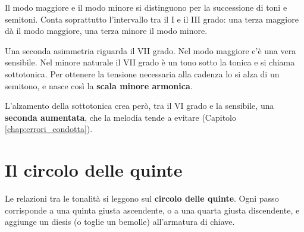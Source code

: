 Il modo maggiore e il modo minore si distinguono per la successione di toni e semitoni. Conta soprattutto l'intervallo tra il I e il III grado: una terza maggiore dà il modo maggiore, una terza minore il modo minore.

Una seconda asimmetria riguarda il VII grado. Nel modo maggiore c'è una vera sensibile. Nel minore naturale il VII grado è un tono sotto la tonica e si chiama sottotonica. Per ottenere la tensione necessaria alla cadenza lo si alza di un semitono, e nasce così la \textbf{scala minore armonica}.

L'alzamento della sottotonica crea però, tra il VI grado e la sensibile, una \textbf{seconda aumentata}, che la melodia tende a evitare (Capitolo \ref{chap:errori_condotta}).

\section{Il circolo delle quinte}
\label{sec:circolo_quinte}

Le relazioni tra le tonalità si leggono sul \textbf{circolo delle quinte}. Ogni passo corrisponde a una quinta giusta ascendente, o a una quarta giusta discendente, e aggiunge un diesis (o toglie un bemolle) all'armatura di chiave.


